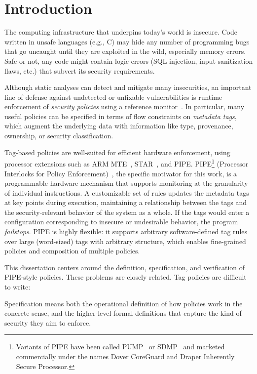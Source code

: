 \documentclass{report}
\begin{document}
\chapter{Introduction}

The computing infrastructure that underpins today's world is insecure. Code written
in unsafe languages (e.g., C) may hide any number of programming bugs that go uncaught
until they are exploited in the wild, especially memory errors. Safe or not, any code
might contain logic errors (SQL injection, input-sanitization flaws, etc.) that subvert
its security requirements.

Although static analyses can detect and mitigate many insecurities, an important line of
defense against undetected or unfixable vulnerabilities is runtime enforcement of
{\em security policies} using a reference monitor~\cite{Anderson72:PlanningStudy}. In particular, 
many useful policies can be specified in terms of flow constraints on 
\emph{metadata tags}, which augment the underlying data with information like type, provenance,
ownership, or security classification.

Tag-based policies are well-suited for efficient hardware enforcement, using 
processor extensions such as ARM MTE~\cite{arm-mte},
STAR~\cite{Gollapudi:23}, and
PIPE.  PIPE\footnote{ Variants of PIPE have
been called PUMP~\cite{Dhawan+15} or %
SDMP~\cite{RoesslerD18}%
and marketed commercially under the names Dover CoreGuard and Draper Inherently Secure Processor.}
(Processor Interlocks for Policy Enforcement)~\cite{Azevedo+16,Azevedo+15},%
the specific motivator for this work, is a programmable hardware mechanism that supports monitoring 
at the granularity of individual instructions. A customizable set of rules updates the metadata tags
at key points during execution, maintaining a relationship between the tags and the security-relevant
behavior of the system as a whole. If the tags would enter a configuration corresponding to insecure
or undesirable behavior, the program \emph{failstops}. PIPE is highly flexible: it supports
arbitrary software-defined tag rules over large (word-sized) tags with arbitrary structure,
which enables fine-grained policies and composition of multiple policies.

This dissertation centers around the definition, specification, and verification of
PIPE-style policies. These problems are closely related. Tag policies are difficult to write:


Specification
means both the operational definition of how policies work in the concrete sense, and
the higher-level formal definitions that capture the kind of security they aim to enforce.
\end{document}
